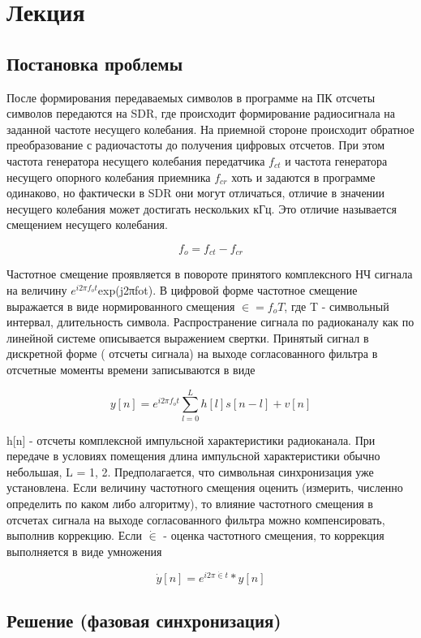 \chapter{Лекция}
\label{ch:intro}

\section{Постановка проблемы}
После формирования передаваемых символов в программе на ПК отсчеты символов передаются на SDR, где происходит формирование радиосигнала
на заданной частоте несущего колебания. На приемной стороне происходит обратное преобразование с радиочастоты до получения цифровых отсчетов. При
этом частота генератора несущего колебания передатчика $f_{ct}$ и частота генератора несущего опорного колебания приемника $f_{cr}$ хоть и задаются в программе
одинаково, но фактически в SDR они могут отличаться, отличие в значении
несущего колебания может достигать нескольких кГц. Это отличие называется
смещением несущего колебания.

$$f_o = f_{ct} - f_{cr}$$

Частотное смещение проявляется в повороте принятого комплексного НЧ
сигнала на величину $e^{i2\pi f_ot}$exp(j2πfot). В цифровой форме частотное смещение выражается в виде нормированного смещения $\in= f_oT$, где T - символьный интервал,
длительность символа.
Распространение сигнала по радиоканалу как по линейной системе описывается выражением свертки. Принятый сигнал в дискретной форме ( отсчеты
сигнала) на выходе согласованного фильтра в отсчетные моменты времени записываются в виде


$$y[n] = e^{i2\pi f_ot}\sum_{l=0}^{L}h[l]s[n-l] + v[n]$$

h[n] - отсчеты комплексной импульсной характеристики радиоканала. При
передаче в условиях помещения длина импульсной характеристики обычно небольшая, L = 1, 2. Предполагается, что символьная синхронизация уже установлена.
Если величину частотного смещения оценить (измерить, численно определить по каком либо алгоритму), то влияние частотного смещения в отсчетах
сигнала на выходе согласованного фильтра можно компенсировать, выполнив
коррекцию. Если $\dot{\in}$ - оценка частотного смещения, то коррекция выполняется в
виде умножения

$$\dot{y}[n] =  e^{i2\pi \dot{\in}t}*y[n]$$

\section{Решение (фазовая синхронизация)}

